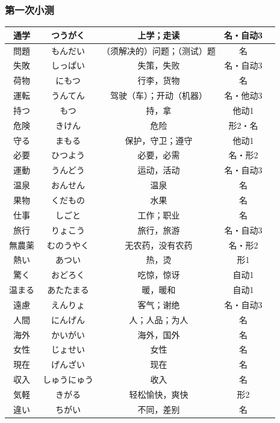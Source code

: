 \subsubsection{第一次小测}
\begin{longtable}{|c|c|c|c|c|}
    \hline
    通学 & つうがく & 上学；走读 & 名・自动3 & \\ \hline
    問題 & もんだい & （须解决的）问题；（测试）题 & 名 & \\ \hline
    失敗 & しっぱい & 失策，失败 & 名・自动3 & \\ \hline
    荷物 & にもつ & 行李，货物 & 名 & \\ \hline
    運転 & うんてん & 驾驶（车）；开动（机器） & 名・他动3 & \\ \hline
    持つ & もつ & 持，拿 & 他动1 & \\ \hline
    危険 & きけん & 危险 & 形2・名 & \\ \hline
    守る & まもる & 保护，守卫；遵守 & 他动1 & \\ \hline
    必要 & ひつよう & 必要，必需 & 名・形2 & \\ \hline
    運動 & うんどう & 运动，活动 & 名・自动3 & \\ \hline
    温泉 & おんせん & 温泉 & 名 & \\ \hline
    果物 & くだもの & 水果 & 名 & \\ \hline
    仕事 & しごと & 工作；职业 & 名 & \\ \hline
    旅行 & りょこう & 旅行，旅游 & 名・自动3 & \\ \hline
    無農薬 & むのうやく & 无农药，没有农药 & 名・形2 & \\ \hline
    熱い & あつい & 热，烫 & 形1 & \\ \hline
    驚く & おどろく & 吃惊，惊讶 & 自动1 & \\ \hline
    温まる & あたたまる & 暖，暖和 & 自动1 & \\ \hline
    遠慮 & えんりょ & 客气；谢绝 & 名・自动3 & \\ \hline
    人間 & にんげん & 人；人品；为人 & 名 & \\ \hline
    海外 & かいがい & 海外，国外 & 名 & \\ \hline
    女性 & じょせい & 女性 & 名 & \\ \hline
    現在 & げんざい & 现在 & 名 & \\ \hline
    収入 & しゅうにゅう & 收入 & 名 & \\ \hline
    気軽 & きがる & 轻松愉快，爽快 & 形2 & \\ \hline
    違い & ちがい & 不同，差别 & 名 & \\ \hline

\end{longtable}

